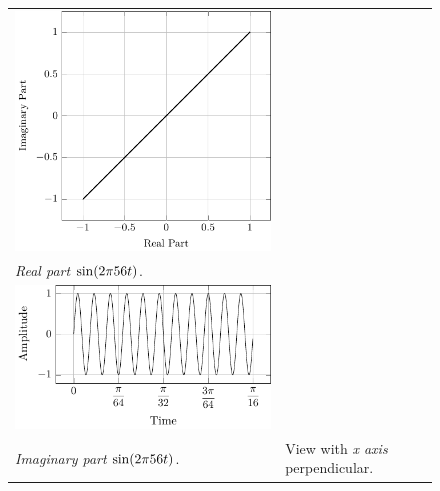 \documentclass[../../course]{subfiles}
\begin{document}
\begin{figure} [H]
\begin{NiceTabularX} {\textwidth} {
            *{2}{>{\centering\arraybackslash}X}
        }
         {
             {
                \includegraphics[height = \textheight] {tikzpics/plotFrontViewComplexE.pdf}
            }
        }

        \\

         {\emph{Real part} $\sin(2 \pi 56 t)$.}
        \label{plt:realCmplxE}

        &
        \\

         {
             {
                \includegraphics[height = \textheight] {tikzpics/plotShortX2.pdf}
            }
        }

        &
        \\

         {\emph{Imaginary part} $\sin(2 \pi 56 t)$.}
        \label{plt:imagCmplxE}

        &

         {View with \emph{x axis} perpendicular.}
        \label{plt:frontViewCmplxE}

        \\

    \end{NiceTabularX}

\end{figure}
\end{document}

